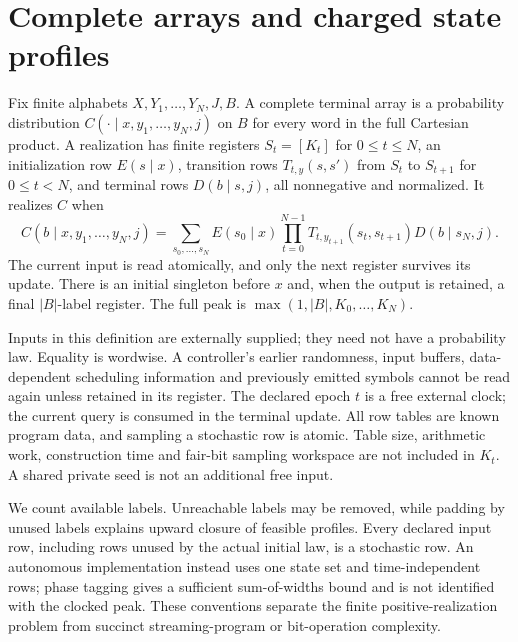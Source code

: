 \section{Complete arrays and charged state profiles}
\label{sec:model}
\begin{definition}\label{def:machine}
Fix finite alphabets $X,Y_1,\ldots,Y_N,J,B$. A complete terminal array
is a probability distribution $C(\cdot\mid x,y_1,\ldots,y_N,j)$ on $B$
for every word in the full Cartesian product. A realization has finite
registers $S_t=[K_t]$ for $0\le t\le N$, an initialization row
$E(s\mid x)$, transition rows
$T_{t,y}(s,s')$ from $S_t$ to $S_{t+1}$ for $0\le t<N$,
and terminal rows $D(b\mid s,j)$, all nonnegative and normalized.
It realizes $C$ when
\begin{equation}\label{eq:machine-product}
 C(b\mid x,y_1,\ldots,y_N,j)
 =\sum_{s_0,\ldots,s_N}E(s_0\mid x)
       \prod_{t=0}^{N-1}T_{t,y_{t+1}}(s_t,s_{t+1})D(b\mid s_N,j).
\end{equation}
The current input is read atomically, and only the next register survives
its update. There is an initial singleton before $x$ and, when the output
is retained, a final $|B|$-label register. The full peak is
$\max(1,|B|,K_0,\ldots,K_N)$.
\end{definition}

Inputs in this definition are externally supplied; they need not have a
probability law. Equality is wordwise. A controller's earlier randomness,
input buffers, data-dependent scheduling information and previously
emitted symbols cannot be read again unless retained in its register.
The declared epoch $t$ is a free external clock; the current query is
consumed in the terminal update. All row tables are known program data,
and sampling a stochastic row is atomic. Table size, arithmetic work,
construction time and fair-bit sampling workspace are not included in
$K_t$. A shared private seed is not an additional free input.

We count available labels. Unreachable labels may be removed, while
padding by unused labels explains upward closure of feasible profiles.
Every declared input row, including rows unused by the actual initial
law, is a stochastic row. An autonomous implementation instead uses one
state set and time-independent rows; phase tagging gives a sufficient
sum-of-widths bound and is not identified with the clocked peak. These
conventions separate the finite positive-realization problem from
succinct streaming-program or bit-operation complexity.

